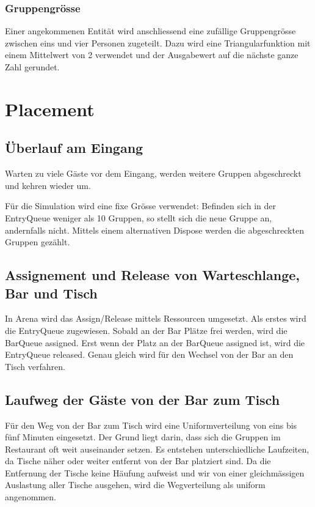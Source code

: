 \documentclass[ngerman,a4paper,12pt]{scrreprt}
\begin{document}
			\subsubsection{Gruppengrösse}
			Einer angekommenen Entität wird anschliessend eine zufällige Gruppengrösse zwischen eins und vier Personen zugeteilt. Dazu wird eine Triangularfunktion mit einem Mittelwert von 2 verwendet und der Ausgabewert auf die nächste ganze Zahl gerundet.
			
	
	\section{Placement}		
		\subsection{Überlauf am Eingang}
			Warten zu viele Gäste vor dem Eingang, werden weitere Gruppen abgeschreckt und kehren wieder um.
		
			Für die Simulation wird eine fixe Grösse verwendet: 			Befinden sich in der EntryQueue weniger als 10 Gruppen, so stellt sich die neue Gruppe an, andernfalls nicht. Mittels einem alternativen Dispose werden die abgeschreckten Gruppen gezählt.
			
			
		\subsection{Assignement und Release von Warteschlange, Bar und Tisch}
			In Arena wird das Assign/Release mittels Ressourcen umgesetzt. Als erstes wird die EntryQueue zugewiesen. Sobald an der Bar Plätze frei werden, wird die BarQueue assigned. Erst wenn der Platz an der BarQueue assigned ist, wird die EntryQueue released. Genau gleich wird für den Wechsel von der Bar an den Tisch verfahren.
	
	
		\subsection{Laufweg der Gäste von der Bar zum Tisch}
			Für den Weg von der Bar zum Tisch wird eine Uniformverteilung von eins bis fünf Minuten eingesetzt. Der Grund liegt darin, dass sich die Gruppen im Restaurant oft weit auseinander setzen. Es entstehen unterschiedliche Laufzeiten, da Tische näher oder weiter entfernt von der Bar platziert sind. Da die Entfernung der Tische keine Häufung aufweist und wir von einer gleichmässigen Auslastung aller Tische ausgehen, wird die Wegverteilung als uniform angenommen.
	
\end{document}
